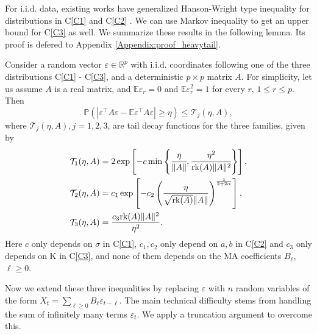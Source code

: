 For i.i.d. data, existing works have generalized Hanson-Wright type inequality  for distributions in C\ref{C1} and  C\ref{C2} \citep{rudelson2013hanson, erdHos2012bulk}. We can use Markov inequality to get an upper bound for C\ref{C3} as well. We summarize these results in the following lemma. Its proof is defered to Appendix \ref{Appendix:proof_heavytail}.

\begin{lem}
\label{lemma:heavy_tail_hanson}
Consider a random vector $\varepsilon \in \mathbb{R}^p$ with i.i.d. coordinates following one of the three distributions C\ref{C1} - C\ref{C3}, and a deterministic $p \times p$ matrix $A$. For simplicity, let us assume $A$ is a real matrix, and  $\mathbb{E} \varepsilon_r = 0$ and $\mathbb{E} \varepsilon^2_r = 1$ for every $r, \, 1 \le r \le p$. Then 
\begin{equation}
\mathbb{P}\left(|\varepsilon^\top A\varepsilon - \mathbb{E} \varepsilon^\top A\varepsilon|\ge \eta\right) \le \mathcal{T}_j(\eta, A), \nonumber
\end{equation}
where $\mathcal{T}_j(\eta, A), j=1,2,3$, are tail decay functions for the three families, given by 
\begin{equation}
\begin{aligned}
&\mathcal{T}_1(\eta, A) =  2\exp\left[-c\min\left\{\cfrac{\eta}{\|A\|}, \cfrac{\eta^2}{\mbox{rk}(A)\|A\|^2}\right\}\right], \nonumber \\
&\mathcal{T}_2(\eta, A) = c_1\exp\left[-c_2\left(\frac{\eta}{\sqrt{\mbox{rk}(A)}\|A\|}\right)^{\frac{1}{2+2\alpha}}\right], \nonumber \\
& \mathcal{T}_3(\eta, A) =  \frac{c_3\mbox{rk}(A)\|A\|^2}{\eta^2}. \nonumber
\end{aligned}
\end{equation}
Here $c$ only depends on $\sigma$ in C\ref{C1}, $c_1, c_2$ only depend on $a, b$ in C\ref{C2} and $c_3$ only depends on K in C\ref{C3}, and none of them depends on the MA coefficients $B_\ell$, $\ell \ge 0$.
\end{lem}


\noindent Now we extend these three inequalities by replacing $\varepsilon$ with $n$ random variables of the form $X_t = \sum_{\ell \ge 0} B_\ell \varepsilon_{t-\ell}$. The main technical difficulty stems from handling the sum of infinitely many terms $\varepsilon_t$. We apply a truncation argument to overcome this. 


